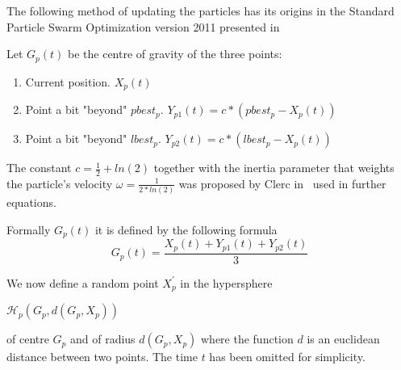 \documentclass[runningheads,a4paper]{llncs}
\begin{document}


%	

The following method of updating the particles has its origins in the Standard Particle Swarm Optimization version 2011 presented in~\cite{pso_11}

Let $G_p(t)$ be the centre of gravity of the three points:
\begin{enumerate}
	\item Current position. $X_p(t)$
	
	\item Point a bit "beyond" $pbest_p$. $Y_{p1}(t) = c*(pbest_p-X_p(t))$
	
	\item Point a bit "beyond" $lbest_p$. $Y_{p2}(t) = c*(lbest_p-X_p(t))$
			
\end{enumerate}

The constant $c = \frac{1}{2} + ln(2)$ together with the inertia parameter that weights the particle's velocity $\omega = \frac{1}{2 * ln(2)}$ was proposed by Clerc in~\cite{pso_anal}  used in further equations. 

Formally $G_p(t)$ it is defined by the following formula 
\begin{equation}
	G_p(t) = \frac{X_p(t) + Y_{p1}(t) + Y_{p2}(t)} {3}
\end{equation}

We now define a random point $X^{'}_p$ in the hypersphere
\begin{center}
	$\mathcal{H}_p(G_p, d(G_p, X_p))$ 
\end{center}
of centre $G_p$ and of radius $d(G_p, X_p)$ where the function $d$ is an euclidean distance between two points. The time $t$ has been omitted for simplicity.
\end{document}

